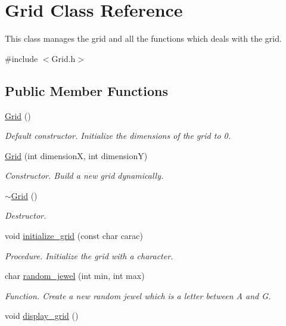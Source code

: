 \hypertarget{classGrid}{}\section{Grid Class Reference}
\label{classGrid}


This class manages the grid and all the functions which deals with the grid.  




{\ttfamily \#include $<$Grid.\+h$>$}

\subsection*{Public Member Functions}
\begin{DoxyCompactItemize}
\item 
\hyperlink{classGrid_a4ac9ff4f63552b4c61ff90fcb35ad66c}{Grid} ()\hypertarget{classGrid_a4ac9ff4f63552b4c61ff90fcb35ad66c}{}\label{classGrid_a4ac9ff4f63552b4c61ff90fcb35ad66c}

\begin{DoxyCompactList}\small\item\em Default constructor. Initialize the dimensions of the grid to 0. \end{DoxyCompactList}\item 
\hyperlink{classGrid_aeb3d81a4eaf308fb7ee1cd691a610b43}{Grid} (int dimensionX, int dimensionY)
\begin{DoxyCompactList}\small\item\em Constructor. Build a new grid dynamically. \end{DoxyCompactList}\item 
\hyperlink{classGrid_a3661d0a7f998caaaf8627d7a67072116}{$\sim$\+Grid} ()\hypertarget{classGrid_a3661d0a7f998caaaf8627d7a67072116}{}\label{classGrid_a3661d0a7f998caaaf8627d7a67072116}

\begin{DoxyCompactList}\small\item\em Destructor. \end{DoxyCompactList}\item 
void \hyperlink{classGrid_a719aca13ba7012373a59f698ee3a5918}{initialize\+\_\+grid} (const char carac)
\begin{DoxyCompactList}\small\item\em Procedure. Initialize the grid with a character. \end{DoxyCompactList}\item 
char \hyperlink{classGrid_a0cbea909ed73a9e2589607e58cd668ef}{random\+\_\+jewel} (int min, int max)
\begin{DoxyCompactList}\small\item\em Function. Create a new random jewel which is a letter between A and G. \end{DoxyCompactList}\item 
void \hyperlink{classGrid_a71f711453d21412be42f1b77e678368f}{display\+\_\+grid} ()\hypertarget{classGrid_a71f711453d21412be42f1b77e678368f}{}\label{classGrid_a71f711453d21412be42f1b77e678368f}


\end{DoxyCompactItemize}
